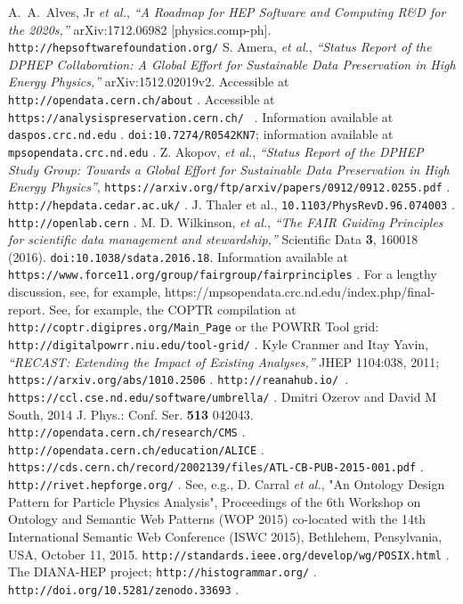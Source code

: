 \documentclass[12pt,a4paper]{article}
\begin{document}
\begin{thebibliography}{99}
  A.~A.~Alves, Jr {\it et al.},
  {\it ``A Roadmap for HEP Software and Computing R\&D for the 2020s,''}
  arXiv:1712.06982 [physics.comp-ph].
 {\tt http://hepsoftwarefoundation.org/}
 S. Amera, {\it et al.}, {\it ``Status Report of the DPHEP Collaboration: A Global Effort for Sustainable Data Preservation in High Energy Physics,''} arXiv:1512.02019v2.
 Accessible at {\tt http://opendata.cern.ch/about} .
 Accessible at {\tt https://analysispreservation.cern.ch/ } .
 Information available at {\tt daspos.crc.nd.edu} .
 {\tt  doi:10.7274/R0542KN7}; information available at {\tt mpsopendata.crc.nd.edu} .
 Z. Akopov, {\it et al.}, {\it ``Status Report of the DPHEP Study Group: Towards a Global Effort for Sustainable Data Preservation in High Energy Physics''}, {\tt https://arxiv.org/ftp/arxiv/papers/0912/0912.0255.pdf} .
 {\tt http://hepdata.cedar.ac.uk/} .
 J. Thaler et al., {\tt 10.1103/PhysRevD.96.074003} .
 {\tt http://openlab.cern} .
 M. D. Wilkinson, {\it et al.}, {\it ``The FAIR Guiding Principles for scientific data management and stewardship,''} Scientific Data {\bf 3}, 160018 (2016).  {\tt doi:10.1038/sdata.2016.18}.  Information available at {\tt https://www.force11.org/group/fairgroup/fairprinciples} .
 For a lengthy discussion, see, for example, https://mpsopendata.crc.nd.edu/index.php/final-report.
 See, for example, the COPTR compilation at {\tt http://coptr.digipres.org/Main\_Page} or the POWRR Tool grid: {\tt http://digitalpowrr.niu.edu/tool-grid/} .
 Kyle Cranmer and Itay Yavin, {\it ``RECAST: Extending the Impact of Existing Analyses,''} JHEP 1104:038, 2011; {\tt https://arxiv.org/abs/1010.2506} .
 {\tt http://reanahub.io/ }.
 {\tt https://ccl.cse.nd.edu/software/umbrella/} .
 Dmitri Ozerov and David M South, 2014 J. Phys.: Conf. Ser. {\bf 513} 042043.
 {\tt http://opendata.cern.ch/research/CMS} .
 {\tt http://opendata.cern.ch/education/ALICE} .
 {\tt https://cds.cern.ch/record/2002139/files/ATL-CB-PUB-2015-001.pdf} .
  {\tt http://rivet.hepforge.org/} .
 See, e.g., D. Carral {\it et al.}, "An Ontology Design Pattern for Particle Physics Analysis", Proceedings of the 6th Workshop on Ontology and Semantic Web Patterns (WOP 2015) co-located with the 14th International Semantic Web Conference (ISWC 2015), Bethlehem, Pensylvania, USA, October 11, 2015.
 {\tt http://standards.ieee.org/develop/wg/POSIX.html} .
 The DIANA-HEP project;  {\tt http://histogrammar.org/} .
 {\tt http://doi.org/10.5281/zenodo.33693} .


\end{thebibliography}


 
\end{document}
